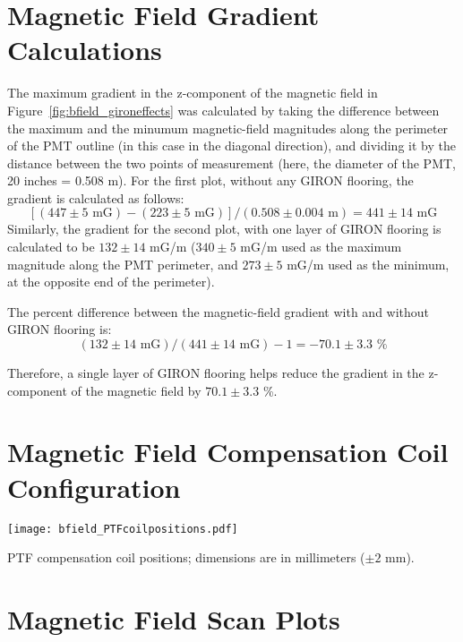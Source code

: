 
\appendix

\section{Magnetic Field Gradient Calculations}
\label{Appendix:MagneticFieldGradientCalculations}

The maximum gradient in the z-component of the magnetic field in Figure~\ref{fig:bfield_gironeffects} was calculated by taking the difference between the maximum and the minumum magnetic-field magnitudes along the perimeter of the PMT outline (in this case in the diagonal direction), and dividing it by the distance between the two points of measurement (here, the diameter of the PMT, 20 inches = 0.508 m).
For the first plot, without any GIRON flooring, the gradient is calculated as follows:
\[[(447\pm5 \text{ mG}) - (223\pm5 \text{ mG})]/ (0.508\pm0.004 \text{ m} ) = 441\pm14 \text{ mG} \]
Similarly, the gradient for the second plot, with one layer of GIRON flooring is calculated to be $ 132\pm14 $ mG/m ($ 340\pm5 $ mG/m used as the maximum magnitude along the PMT perimeter, and $ 273\pm5 $ mG/m used as the minimum, at the opposite end of the perimeter).

The percent difference between the magnetic-field gradient with and without GIRON flooring is:
\[(132\pm14 \text{ mG})/(441\pm14 \text{ mG}) - 1 = -70.1\pm3.3 \text{ \%}\]

Therefore, a single layer of GIRON flooring helps reduce the gradient in the z-component of the magnetic field by $ 70.1\pm3.3 $ \%.

\newpage
\section{Magnetic Field Compensation Coil Configuration}
\label{Appendix:CoilPositions}
%
\begin{center}
\texttt{[image: bfield\_PTFcoilpositions.pdf]}
\caption{PTF compensation coil positions; dimensions are in millimeters ($\pm2$ mm).}
\label{fig:coilpos}
\end{center}
%

\newpage
\section{Magnetic Field Scan Plots}
\label{Appendix:MagneticFieldScanPlots}

